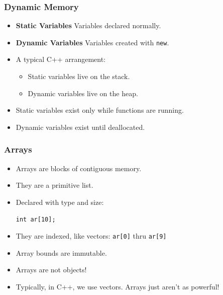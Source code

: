 \documentclass[handout]{beamer}
\begin{document}
\begin{frame}
    \frametitle{Dynamic Memory}
    \begin{itemize}
        \item {\bf Static Variables} Variables declared normally.
        \item {\bf Dynamic Variables} Variables created with {\tt new}.
        \item A typical C++ arrangement:
        \begin{itemize}
            \item Static variables live on the stack.
            \item Dynamic variables live on the heap.
        \end{itemize}
        \item Static variables exist only while functions are running.
        \item Dynamic variables exist until deallocated.
    \end{itemize}
\end{frame}

\begin{frame}
    \frametitle{Arrays}
    \begin{itemize}
        \item Arrays are blocks of contiguous memory.
        \item They are a primitive list.
        \item Declared with type and size:
              \par {\tt int ar[10];}
        \item They are indexed, like vectors: {\tt ar[0]} thru {\tt ar[9]}
        \item Array bounds are immutable.
        \item Arrays are not objects!
        \item Typically, in C++, we use vectors.  Arrays just aren't as
            powerful!
    \end{itemize}
\end{frame}
\end{document}
